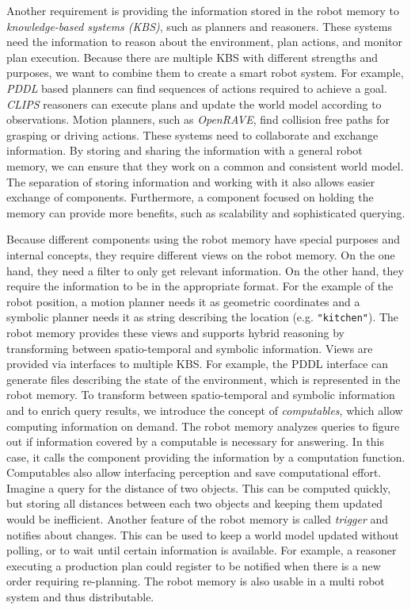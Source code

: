 Another requirement is providing the information stored in the robot
memory to \emph{knowledge-based systems (KBS)}, such as planners and
reasoners. These systems need the information to reason about the
environment, plan actions, and monitor plan execution. Because there
are multiple KBS with different strengths and purposes, we want to
combine them to create a smart robot system. For example, \emph{PDDL}
based planners can find sequences of actions required to achieve a
goal. \emph{CLIPS} reasoners can execute plans and update the world
model according to observations. Motion planners, such as
\emph{OpenRAVE}, find collision free paths for grasping or driving
actions. These systems need to collaborate and exchange
information. By storing and sharing the information with a general
robot memory, we can ensure that they work on a common and consistent
world model. The separation of storing information and working with it
also allows easier exchange of components. Furthermore, a component
focused on holding the memory can provide more benefits, such as
scalability and sophisticated querying.

Because different components using the robot memory have special
purposes and internal concepts, they require different views on the
robot memory. On the one hand, they need a filter to only get relevant
information. On the other hand, they require the information to be in
the appropriate format. For the example of the robot position, a
motion planner needs it as geometric coordinates and a symbolic planner needs
it as string describing the location (e.g. \texttt{"kitchen"}). The robot memory
provides these views and supports hybrid reasoning by transforming
between spatio-temporal and symbolic information. Views are provided via
interfaces to multiple KBS. For example, the PDDL interface can
generate files describing the state of the environment, which is
represented in the robot memory.  To transform between spatio-temporal
and symbolic information and to enrich query results, we introduce the concept of
\emph{computables}, which allow computing information on demand. The
robot memory analyzes queries to figure out if information covered by
a computable is necessary for answering. In this case, it calls the
component providing the information by a computation
function. Computables also allow interfacing perception and save
computational effort. Imagine a query for the distance of
two objects. This can be computed quickly, but storing all distances
between each two objects and keeping them updated would be
inefficient.
%
Another feature of the robot memory is called \emph{trigger} and
notifies about changes. This can be used to keep a world model updated
without polling, or to wait until certain information is
available. For example, a reasoner executing a production plan could
register to be notified when there is a new order requiring
re-planning. The robot memory is also usable in a multi robot
system and thus distributable.

